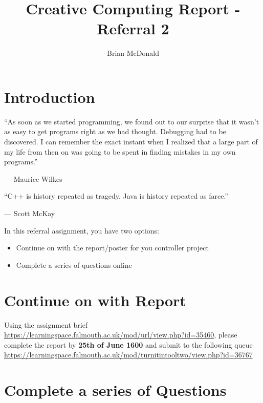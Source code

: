 \documentclass{../../../fal_assignment}
\title{Creative Computing Report - Referral 2}
\author{Brian McDonald}
\begin{document}
	
	\maketitle
	
	\section*{Introduction}
	
	\begin{marginquote}
		``As soon as we started programming, we found out to our surprise that it wasn't as easy to get programs right as we had thought. Debugging had to be discovered. I can remember the exact instant when I realized that a large part of my life from then on was going to be spent in finding mistakes in my own programs.''
		\par --- Maurice Wilkes
		\marginquoterule
		\par ``C++ is history repeated as tragedy. Java is history repeated as farce.''
		\par --- Scott McKay
	\end{marginquote}
	
	In this referral assignment, you have two options:
	
	\begin{itemize}
		\item Continue on with the report/poster for you controller project
		\item Complete a series of questions online 
	\end{itemize}

	\section*{Continue on with Report}
	
	Using the assignment brief \href{https://learningspace.falmouth.ac.uk/mod/url/view.php?id=35460}{https://learningspace.falmouth.ac.uk/mod/url/view.php?id=35460}, please complete the report by \textbf{25th of June 1600} and submit to the following queue \href{https://learningspace.falmouth.ac.uk/mod/turnitintooltwo/view.php?id=36767}{https://learningspace.falmouth.ac.uk/mod/turnitintooltwo/view.php?id=36767}
	
	\section*{Complete a series of Questions}
	
\end{document}
